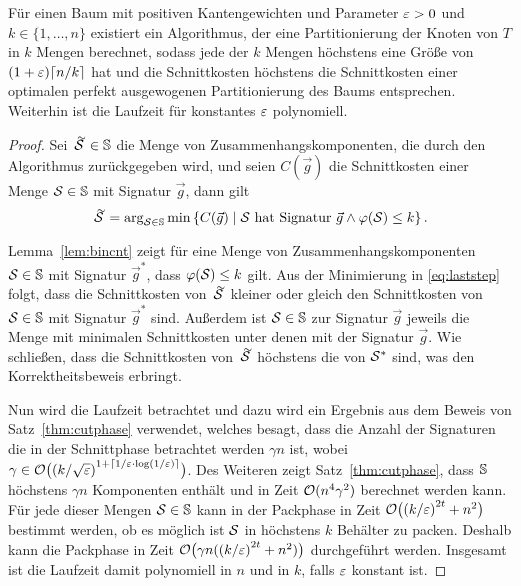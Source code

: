    \begin{thm}\label{thm:treealg}
        Für einen Baum mit positiven Kantengewichten und Parameter $\varepsilon > 0$ und $k \in \{1, \ldots, n\}$ existiert ein Algorithmus, der eine Partitionierung der Knoten von $T$ in $k$ Mengen berechnet, sodass jede der $k$ Mengen höchstens eine Größe von $(1 + \eps) \ceil*{n/k}$ hat und die Schnittkosten höchstens die Schnittkosten einer optimalen perfekt ausgewogenen Partitionierung des Baums entsprechen. 
        Weiterhin ist die Laufzeit für konstantes $\varepsilon$ polynomiell.
    \end{thm}
    \begin{proof}
        Sei $\tildaS \in \bbS$ die Menge von Zusammenhangskomponenten, die durch den Algorithmus zurückgegeben wird, und seien $C(\vec{g})$ die Schnittkosten einer Menge $\mathcal{S} \in \mathbb{S}$ mit Signatur $\vec{g}$, dann gilt
        \begin{equation}\label{eq:laststep}
            \tildaS = \arg_{\calS \in \bbS} \min \left\{ C(\vec{g}) \mid \calS\ \text{hat Signatur}\ \vec{g} \land \varphi(\calS) \leq k \right\}.
        \end{equation}

        Lemma~\ref{lem:bincnt} zeigt für eine Menge von Zusammenhangskomponenten $\mathcal{S} \in \mathbb{S}$ mit Signatur $\vec{g}^*$, dass $\varphi(\mathcal{S}) \leq k$ gilt.
        Aus der Minimierung in \eqref{eq:laststep} folgt, dass die Schnittkosten von $\tildaS$ kleiner oder gleich den Schnittkosten von $\mathcal{S} \in \mathbb{S}$ mit Signatur $\vec{g}^*$ sind.
        Außerdem ist $\mathcal{S} \in \mathbb{S}$ zur Signatur $\vec{g}$ jeweils die Menge mit minimalen Schnittkosten unter denen mit der Signatur $\vec{g}$.
        Wie schließen, dass die Schnittkosten von $\tildaS$ höchstens die von $\mathcal{S}^*$ sind, was den Korrektheitsbeweis erbringt.

        Nun wird die Laufzeit betrachtet und dazu wird ein Ergebnis aus dem Beweis von Satz~\ref{thm:cutphase} verwendet, welches besagt, dass die Anzahl der Signaturen die in der Schnittphase betrachtet werden $\gamma n$ ist, wobei $\gamma \in \mathcal{O}\big({(k/\sqrt{\varepsilon})}^{1 + \lceil1/\varepsilon \cdot \log(1/\varepsilon)\rceil}\big)$. 
        Des Weiteren zeigt Satz~\ref{thm:cutphase}, dass $\mathbb{S}$ höchstens $\gamma n$ Komponenten enthält und in Zeit $\mathcal{O}(n^4 \gamma^2)$ berechnet werden kann. 
        Für jede dieser Mengen $\mathcal{S} \in \mathbb{S}$ kann in der Packphase in Zeit $\mathcal{O} \big({(k/\varepsilon)}^{2t} + n^2\big)$ bestimmt werden, ob es möglich ist $\mathcal{S}$ in höchstens $k$ Behälter zu packen.
        Deshalb kann die Packphase in Zeit $\mathcal{O} \big(\gamma n ({(k/\varepsilon)}^{2t} + n^2)\big)$ durchgeführt werden.
        Insgesamt ist die Laufzeit damit polynomiell in $n$ und in $k$, falls $\varepsilon$ konstant ist.
    \end{proof}

